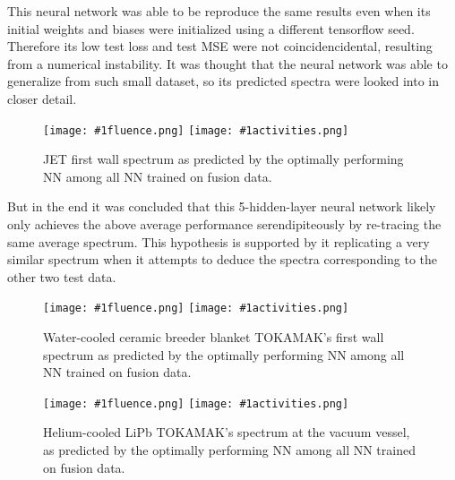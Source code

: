 \documentclass[a4paper, 12pt]{article}
\newcommand{\fluenceandactivities}[1]{
\texttt{[image: \#1fluence.png]}
\texttt{[image: \#1activities.png]}
}
\begin{document}
This neural network was able to be reproduce the same results even when its initial weights and biases were initialized using a different tensorflow seed. Therefore its low test loss and test MSE were not coincidencidental, resulting from a numerical instability. It was thought that the neural network was able to generalize from such small dataset, so its predicted spectra were looked into in closer detail.

\begin{figure}[H]
\centering
\fluenceandactivities{/home/ocean/Documents/GitHubDir/unfolding/unfolding/unfoldingsuite/neuralnetwork/realoutputEarlyStopping/SelectedNNreplicated/fusion-fusion/0927_0220_5_layerfinal_inv_5_test_001_}
\caption{JET first wall spectrum as predicted by the optimally performing NN among all NN trained on fusion data.}\label{5Layerfusion-fusionJET-FW}
\end{figure}

But in the end it was concluded that this 5-hidden-layer neural network likely only achieves the above average performance serendipiteously by re-tracing the same average spectrum. This hypothesis is supported by it replicating a very similar spectrum when it attempts to deduce the spectra corresponding to the other two test data.

\begin{figure}[H]
\centering
\fluenceandactivities{/home/ocean/Documents/GitHubDir/unfolding/unfolding/unfoldingsuite/neuralnetwork/realoutputEarlyStopping/SelectedNNreplicated/fusion-fusion/0927_0220_5_layerfinal_inv_5_test_002_}
\caption{Water-cooled ceramic breeder blanket TOKAMAK's first wall spectrum as predicted by the optimally performing NN among all NN trained on fusion data.}\label{5Layerfusion-fusionWCCB-FW}
\end{figure}

\begin{figure}[H]
\centering
\fluenceandactivities{/home/ocean/Documents/GitHubDir/unfolding/unfolding/unfoldingsuite/neuralnetwork/realoutputEarlyStopping/SelectedNNreplicated/fusion-fusion/0927_0220_5_layerfinal_inv_5_test_003_}
\caption{Helium-cooled LiPb TOKAMAK's spectrum at the vacuum vessel, as predicted by the optimally performing NN among all NN trained on fusion data.}\label{5Layerfusion-fusionHCLL-VV}
\end{figure}
\end{document}
